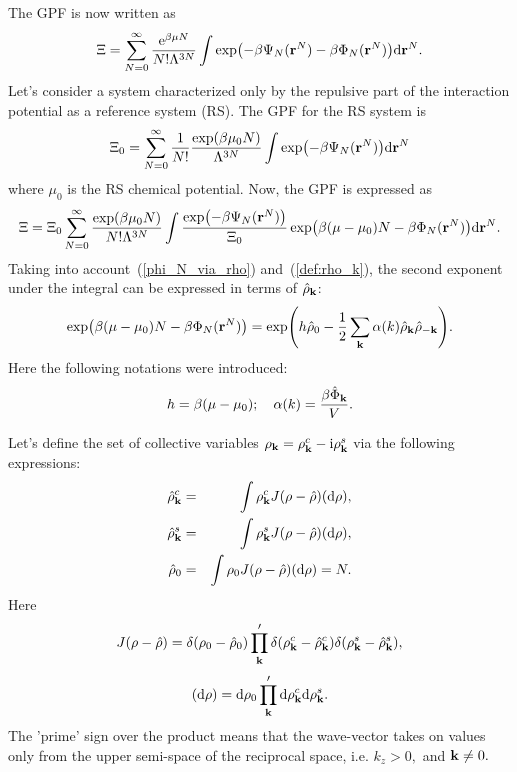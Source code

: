 The GPF is now written as
\begin{equation}
	\Xi = \sum_{N=0}^{\infty}\frac{{\rm e}^{\beta\mu N}}{N!\Lambda^{3N}} \int \exp(-\beta\Psi_N(\vb r^N) - \beta\Phi_N(\vb r^N)) {\rm d} {\vb r}^N.
\end{equation}
Let's consider a system characterized only by the repulsive part of the interaction potential as a reference system (RS). The GPF for the RS system is
\begin{equation}
	\label{def:GPF_0}
	\Xi_0 = \sum_{N=0}^{\infty} \frac{1}{N!} \frac{\exp(\beta\mu_0 N)}{\Lambda^{3N}} \int \exp(-\beta\Psi_N(\vb r^N)) {\rm d} {\vb r}^N
\end{equation}
where $\mu_0$ is the RS chemical potential.
Now, the GPF is expressed as
\begin{equation}
	\Xi = \Xi_0 \sum_{N=0}^{\infty} \frac{\exp(\beta\mu_0 N)}{N! \Lambda^{3N}} \int \frac{\exp(-\beta \Psi_N (\vb r^N))}{\Xi_0} \exp(\beta(\mu - \mu_0)N - \beta\Phi_N(\vb r^N)) {\rm d} {\vb r^N}.
\end{equation}
Taking into account~(\ref{phi_N_via_rho}) and~(\ref{def:rho_k}), the second exponent under the integral can be expressed in terms of $\hat{\rho}_{\vb k}$:
\begin{equation}
	\label{exp_attr}
	\exp(\beta(\mu - \mu_0)N - \beta\Phi_N(\vb r^N)) = \exp(h\hat{\rho}_0 - \frac{1}{2} \sum_{\vb k} \alpha(k) \hat{\rho}_{\vb k} \hat{\rho}_{-\vb k} ).
\end{equation}
Here the following notations were introduced:
\begin{equation}
	\label{def:h}
	h = \beta (\mu - \mu_0); \quad \alpha(k) = \frac{\beta\hat{\Phi}_{\vb k}}{V}.
\end{equation}

Let's define the set of collective variables $\rho_{\vb k} = \rho_{\vb k}^c - {\rm i} \rho_{\vb k}^s$ via the following expressions:
\begin{eqnarray}
	\label{def:col_var}
	\hat{\rho}_{\vb k}^c &=& \int\rho_{\vb k}^c J(\rho - \hat{\rho}) ({\rm d}\rho),
	\nonumber\\
	\hat{\rho}_{\vb k}^s &=& \int\rho_{\vb k}^s J(\rho - \hat{\rho}) ({\rm d}\rho),
	\nonumber\\
	\hat{\rho}_0 &=&  \int\rho_0 J(\rho - \hat{\rho}) ({\rm d}\rho) = N.
\end{eqnarray}
Here
\begin{equation}
	J(\rho - \hat{\rho}) = \delta(\rho_0 - \hat{\rho}_0) \prod_{\vb k}' \delta(\rho_{\vb k}^c - \hat{\rho}_{\vb k}^c) \delta(\rho_{\vb k}^s - \hat{\rho}_{\vb k}^s),
\end{equation}
\begin{equation}
	({\rm d} \rho) = {\rm d}\rho_0 \prod_{\vb k}' {\rm d}\rho_{\vb k}^c {\rm d}\rho_{\vb k}^s.
\end{equation}
The 'prime' sign over the product means that the wave-vector takes on values only from the upper semi-space of the reciprocal space, i.e. $k_z>0,$ and $\vb k \neq 0.$

